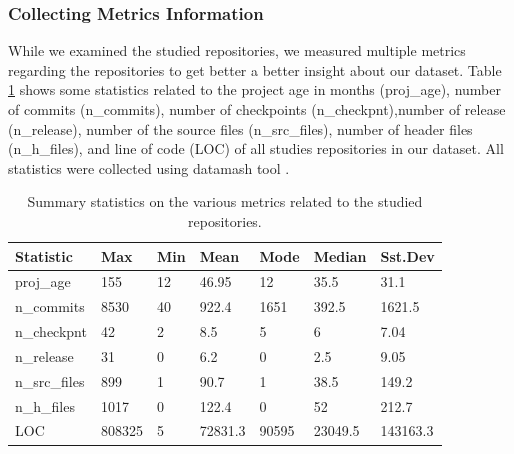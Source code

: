 


\subsubsection{\textbf{Collecting Metrics Information}}
While we examined the studied repositories, we measured multiple metrics regarding the repositories to get better a better insight about our dataset. Table \ref{stat} shows some statistics related to the project age in months (proj\_age), number of commits (n\_commits),  number of checkpoints (n\_checkpnt),number of release (n\_release), number of the source files (n\_src\_files), number of header files (n\_h\_files), and line of code (LOC) of all studies repositories in our dataset. All statistics were collected using datamash tool \cite{datamash}.


\begin{table}[ht]
\centering
\scriptsize
\caption{Summary statistics on the various metrics related to the studied repositories.}
\label{stat}
\begin{tabular}{||p{1cm}|p{.5cm} p{.3cm} p{1cm} p{.6cm} p{.8cm} p{1cm}||}
\hline
\textbf{Statistic} & \textbf{Max} &	 \textbf{Min} 	& \textbf{Mean} 	&	 \textbf{Mode} 	& \textbf{Median} 	&  \textbf{Sst.Dev}\\
\hline\hline
proj\_age & 155 &	12	& 46.95	 & 12	& 35.5	& 31.1 \\                n\_commits & 8530	& 40& 	922.4	& 1651	& 392.5	& 1621.5 \\ 
n\_checkpnt & 42& 2	&8.5	&5&	6	&7.04  \\
n\_release &31	&0&	6.2	&0	&2.5 &	9.05  \\
n\_src\_files &899	&1	& 90.7 &	1 &38.5	&149.2 \\
n\_h\_files & 1017&	0&	122.4	&0	&52	& 212.7\\
LOC & 808325	& 5	&72831.3 &	90595	&23049.5&	143163.3  \\
\hline


\end{tabular}
\end{table}


